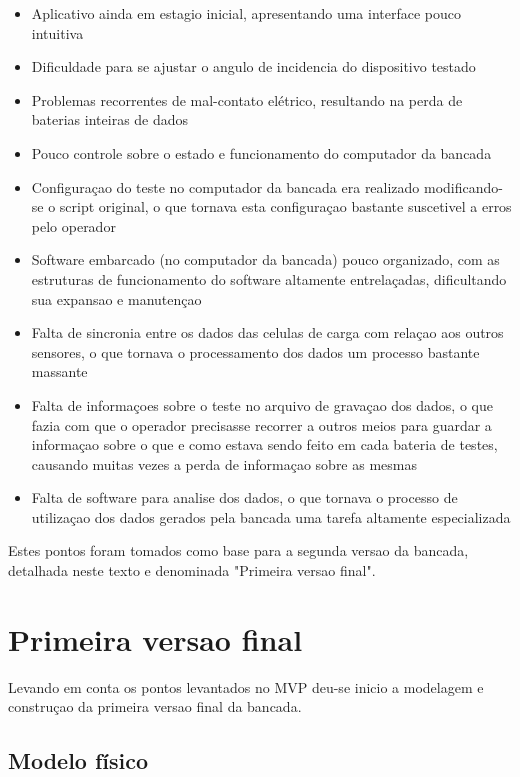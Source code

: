 \begin{itemize}
    \item Aplicativo ainda em estagio inicial, apresentando uma interface pouco intuitiva
    \item Dificuldade para se ajustar o angulo de incidencia do dispositivo testado
    \item Problemas recorrentes de mal-contato elétrico, resultando na perda de baterias inteiras de dados
    \item Pouco controle sobre o estado e funcionamento do computador da bancada
    \item Configuraçao do teste no computador da bancada era realizado modificando-se o script original, o que tornava esta configuraçao bastante suscetivel a erros pelo operador 
    \item Software embarcado (no computador da bancada) pouco organizado, com as estruturas de funcionamento do software altamente entrelaçadas, dificultando sua expansao e manutençao
    \item Falta de sincronia entre os dados das celulas de carga com relaçao aos outros sensores, o que tornava o processamento dos dados um processo bastante massante
    \item Falta de informaçoes sobre o teste no arquivo de gravaçao dos dados, o que fazia com que o operador precisasse recorrer a outros meios para guardar a informaçao sobre o que e como estava sendo feito em cada bateria de testes, causando muitas vezes a perda de informaçao sobre as mesmas
    \item Falta de software para analise dos dados, o que tornava o processo de utilizaçao dos dados gerados pela bancada uma tarefa altamente especializada
\end{itemize}

Estes pontos foram tomados como base para a segunda versao da bancada, detalhada neste texto e denominada "Primeira versao final".

\section{Primeira versao final}

Levando em conta os pontos levantados no MVP deu-se inicio a modelagem e construçao da primeira versao final da bancada.

\subsection{Modelo físico}


